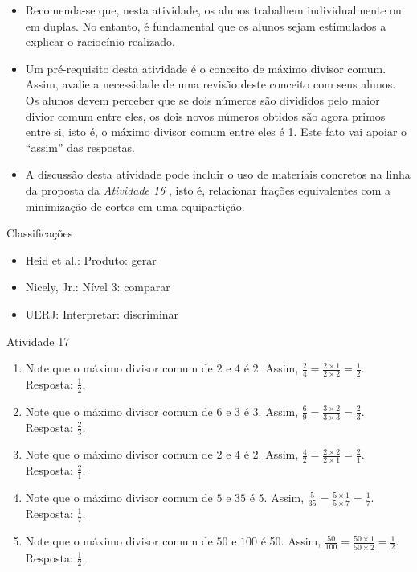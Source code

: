\begin{multicols}{2}
 
\begin{itemize} %
    \item       Recomenda-se que, nesta atividade, os alunos trabalhem 
individualmente ou em duplas. No entanto, é fundamental que os alunos sejam 
estimulados a explicar o raciocínio realizado.
    \item       Um pré-requisito desta atividade é o conceito de máximo divisor 
comum. Assim, avalie a necessidade de uma revisão deste conceito com seus 
alunos. Os alunos devem perceber que se dois números são divididos pelo maior 
divior comum entre eles, os dois novos números obtidos são agora primos entre 
si, isto é, o máximo divisor comum entre eles é 1. Este fato vai apoiar o       
``assim''       das respostas. 
    \item       A discussão desta atividade pode incluir o uso de materiais 
concretos na linha da proposta da \emph{Atividade 16}      , isto é, relacionar  
frações equivalentes com a minimização de cortes em uma equipartição.
\end{itemize} %
  
  Classificações  
\begin{itemize} %
    \item       Heid et al.: Produto: gerar
    \item       Nicely, Jr.: Nível 3: comparar
    \item       UERJ: Interpretar: discriminar
\end{itemize} %

\begin{resposta*}{Atividade 17}
\begin{enumerate}
 \item Note que o máximo divisor comum de   $2$   e   $4$   é 2. Assim,   
$\frac{2}{4} = \frac{2 \times 1}{2 \times 2} = \frac{1}{2}$. Resposta:   
$\frac{1}{2}$.  
 \item Note que o máximo divisor comum de   $6$   e   $3$   é 3. Assim,   
$\frac{6}{9} = \frac{3 \times 2}{3 \times 3} = \frac{2}{3}$. Resposta:   
$\frac{2}{3}$.  
 \item Note que o máximo divisor comum de   $2$   e   $4$   é 2. Assim,   
$\frac{4}{2} = \frac{2 \times 2}{2 \times 1} = \frac{2}{1}$. Resposta:   
$\frac{2}{1}$.  
 \item Note que o máximo divisor comum de   $5$   e   $35$   é 5. Assim,   
$\frac{5}{35} = \frac{5 \times 1}{5 \times 7} = \frac{1}{7}$. Resposta:   
$\frac{1}{7}$.  
 \item Note que o máximo divisor comum de   $50$   e   $100$   é 50. Assim,   
$\frac{50}{100} = \frac{50 \times 1}{50 \times 2} = \frac{1}{2}$. Resposta:   
$\frac{1}{2}$.  
\end{enumerate}


\end{resposta*}
\end{multicols}
